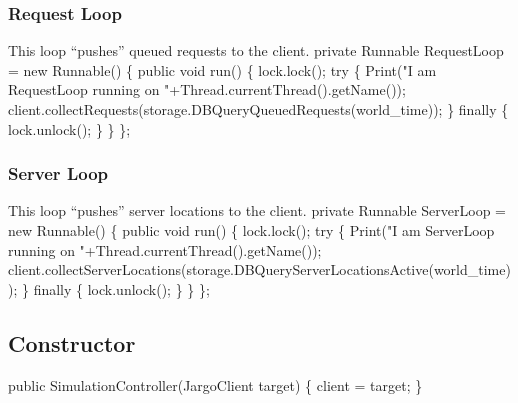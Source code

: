 \documentclass{article}
\def\nwendcode{\endtrivlist \endgroup}
\let\nwdocspar=\par
\begin{document}
\subsubsection{Request Loop}
This loop ``pushes'' queued requests to the client.
\nwenddocs{}\endmoddef{}
private Runnable RequestLoop = new Runnable() \{
  public void run() \{
    lock.lock();
    try \{
      Print("I am RequestLoop running on "+Thread.currentThread().getName());
      client.collectRequests(storage.DBQueryQueuedRequests(world_time));
    \} finally \{
      lock.unlock();
    \}
  \}
\};
\eatline
{}\nwendcode{}\nwdocspar
\subsubsection{Server Loop}
This loop ``pushes'' server locations to the client.
\nwenddocs{}\endmoddef{}
private Runnable ServerLoop = new Runnable() \{
  public void run() \{
    lock.lock();
    try \{
      Print("I am ServerLoop running on "+Thread.currentThread().getName());
      client.collectServerLocations(storage.DBQueryServerLocationsActive(world_time));
    \} finally \{
      lock.unlock();
    \}
  \}
\};
\eatline
{}\nwendcode{}\nwdocspar
\subsection{Constructor}
\nwenddocs{}\endmoddef{}
public SimulationController(JargoClient target) \{
  client = target;
\}
\nwendcode{}\nwdocspar
\end{document}
